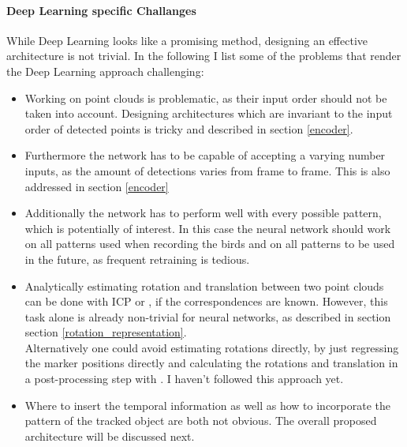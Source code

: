 \documentclass{article}
\begin{document}
\paragraph{Deep Learning specific Challanges} While Deep Learning looks like a promising method, designing an effective architecture is not trivial. In the following I list some of the problems that render the Deep Learning approach challenging:
\begin{itemize}
	\item Working on point clouds is problematic, as their input order should not be taken into account. Designing architectures which are invariant to the input order of detected points is tricky and described in section \ref{encoder}.
	\item Furthermore the network has to be capable of accepting a varying number inputs, as the amount of detections varies from frame to frame. This is also addressed in section \ref{encoder}
	\item Additionally the network has to perform well with every possible pattern, which is potentially of interest. In this case the neural network should work on all patterns used when recording the birds and on all patterns to be used in the future, as frequent retraining is tedious.
	\item Analytically estimating rotation and translation between two point clouds can be done with ICP or \cite{umeyama}, if the correspondences are known. However, this task alone is already non-trivial for neural networks, as described in section section \ref{rotation_representation}.\\
	Alternatively one could avoid estimating rotations directly, by just regressing the marker positions directly and calculating the rotations and translation in a post-processing step with \cite{umeyama}. I haven't followed this approach yet.
	\item Where to insert the temporal information as well as how to incorporate the pattern of the tracked object are both not obvious. The overall proposed architecture will be discussed next.

\end{itemize}
\end{document}
